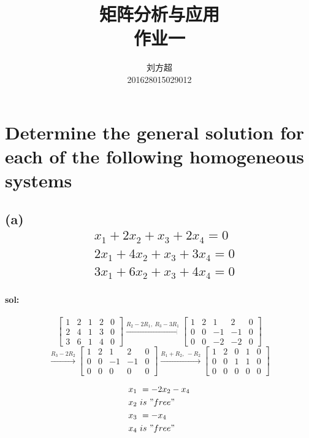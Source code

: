 \documentclass{article}
\author{刘方超\\201628015029012}
\title{矩阵分析与应用\\作业一}
\begin{document}
	\maketitle
	\setcounter{section}{2}
	\section{Determine the general solution for each of the following homogeneous systems}
	\subsection*{(a)
		\begin{align*}
			&x_1+2x_2+x_3+2x_4=0\\	
			&2x_1+4x_2+x_3+3x_4=0\\	&3x_1+6x_2+x_3+4x_4=0
		\end{align*}
	}
	\paragraph{sol:}
	\[
	\left[
		\begin{array}{cccc|c}
			1 & 2 & 1 & 2 & 0\\
			2 & 4 & 1 & 3 & 0\\
			3 & 6 & 1 & 4 & 0
		\end{array}
	\right]
	\xrightarrow{R_2-2R_1,\ R_3-3R_1}
	\left[
		\begin{array}{cccc|c}
			1 & 2 & 1 & 2 & 0\\
			0 & 0 & -1 & -1 & 0\\
			0 & 0 & -2 & -2 & 0
		\end{array}
	\right]	
	\]
	\[
	\xrightarrow{R_3-2R_2}
	\left[
		\begin{array}{cccc|c}
			1 & 2 & 1 & 2 & 0\\
			0 & 0 & -1 & -1 & 0\\
			0 & 0 & 0 & 0 & 0
		\end{array}
	\right]
	\xrightarrow{R_1+R_2,\ -R_2}
	\left[
		\begin{array}{cccc|c}
			1 & 2 & 0 & 1 & 0\\
			0 & 0 & 1 & 1 & 0\\
			0 & 0 & 0 & 0 & 0
		\end{array}
	\right]
	\]
	
	\begin{align*}
		x_1\ &= -2x_2-x_4\\
		x_2\ &is \ "free"\\
		x_3\ &= -x_4\\
		x_4\ &is \ "free"
	\end{align*}
		
\end{document}
